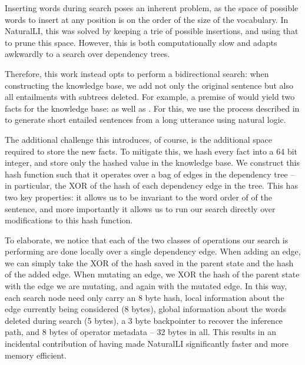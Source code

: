 %
%
Inserting words during search poses an inherent problem, 
  as the space of possible words to insert at any
  position is on the order of the size of the vocabulary.
In NaturalLI, this was solved by keeping a trie of possible insertions, and
  using that to prune this space.
However, this is both computationally slow and adapts awkwardly to a search over
  dependency trees.

Therefore, this work instead opts to perform a bidirectional search:
  when constructing the knowledge base, we add not only the original sentence but
  also all entailments with subtrees deleted.
For example, a premise of  would yield two facts
  for the knowledge base:  as well as .
For this, we use the process described in  to
  generate short entailed sentences from a long utterance using natural logic.

The additional challenge this introduces, of course, is the additional space required
  to store the new facts.
To mitigate this, we hash every fact into a 64 bit integer, and store only the hashed 
  value in the knowledge base.
We construct this hash function such that it operates over a bag of edges in the
  dependency tree -- in particular, the XOR of the hash of each dependency edge in
  the tree.
This has two key properties: it allows us to be invariant to the word order of
  of the sentence, and more importantly it allows us to run our search directly
  over modifications to this hash function.

To elaborate, we notice that each of the two classes of operations our search is
  performing are done locally over a single dependency edge.
When adding an edge, we can simply take the XOR of the hash saved in the 
  parent state and the hash of the added edge.
When mutating an edge, we XOR the hash of the parent state with the edge we are
  mutating, and again with the mutated edge.
In this way, each search node need only carry an 8 byte hash, local information
  about the edge currently being considered (8 bytes), global information about the words
  deleted during search (5 bytes), a 3 byte backpointer to recover the
  inference path, and 8 bytes of operator metadata -- 32 bytes in all.
This results in an incidental contribution of having made NaturalLI significantly
  faster and more memory efficient.

